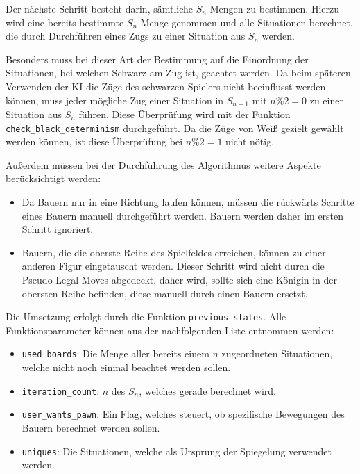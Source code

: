 \documentclass[12pt]{article}
\providecommand{\tightlist}{%
      \setlength{\itemsep}{0pt}\setlength{\parskip}{0pt}}
\begin{document}
Der nächste Schritt besteht darin, sämtliche \(S_{n}\) Mengen zu
bestimmen. Hierzu wird eine bereits bestimmte \(S_n\) Menge genommen und
alle Situationen berechnet, die durch Durchführen eines Zugs zu einer
Situation aus \(S_n\) werden.

Besonders muss bei dieser Art der Bestimmung auf die Einordnung der
Situationen, bei welchen Schwarz am Zug ist, geachtet werden. Da beim
späteren Verwenden der KI die Züge des schwarzen Spielers nicht
beeinflusst werden können, muss jeder mögliche Zug einer Situation in
\(S_{n+1}\) mit \(n \% 2 = 0\) zu einer Situation aus \(S_n\) führen.
Diese Überprüfung wird mit der Funktion
\texttt{check\_black\_determinism} durchgeführt. Da die Züge von Weiß
gezielt gewählt werden können, ist diese Überprüfung bei \(n \% 2 = 1\)
nicht nötig.

Außerdem müssen bei der Durchführung des Algorithmus weitere Aspekte
berücksichtigt werden: 
\begin{itemize}
	\item Da Bauern nur in eine Richtung laufen können,
	müssen die rückwärts Schritte eines Bauern manuell durchgeführt werden.
	Bauern werden daher im ersten Schritt ignoriert. 
	\item Bauern, die die oberste Reihe des Spielfeldes erreichen, können zu einer anderen Figur
	eingetauscht werden. Dieser Schritt wird nicht durch die Pseudo-Legal-Moves abgedeckt, daher wird, sollte sich eine Königin in der obersten Reihe befinden, diese manuell durch einen Bauern ersetzt.
\end{itemize}

Die Umsetzung erfolgt durch die Funktion \texttt{previous\_states}. Alle
Funktionsparameter können aus der nachfolgenden Liste entnommen werden:

\begin{itemize}
\tightlist
\item
  \texttt{used\_boards}: Die Menge aller bereits einem \(n\)
  zugeordneten Situationen, welche nicht noch einmal beachtet werden
  sollen.
\item
  \texttt{iteration\_count}: \(n\) des \(S_n\), welches gerade berechnet
  wird.
\item
  \texttt{user\_wants\_pawn}: Ein Flag, welches steuert, ob spezifische
  Bewegungen des Bauern berechnet werden sollen.
\item
  \texttt{uniques}: Die Situationen, welche als Ursprung der Spiegelung
  verwendet werden.
\end{itemize}
\end{document}
